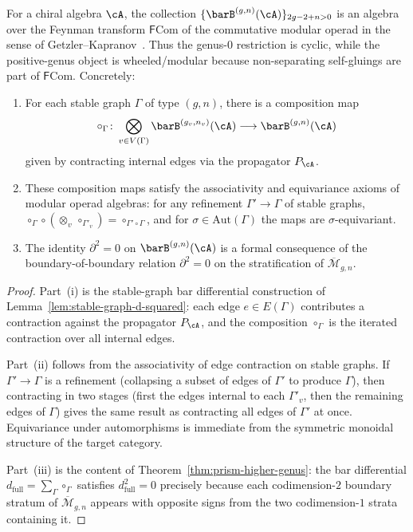 \begin{theorem}\label{thm:bar-modular-operad}%
%
%
%
For a chiral algebra $\cA$, the collection
$\{\barB^{(g,n)}(\cA)\}_{2g-2+n>0}$ is an algebra over the Feynman transform
$\mathsf{F}\mathrm{Com}$ of the commutative modular operad in the sense of
Getzler--Kapranov~\textup{\cite{GetzlerKapranov98}}. Thus the
genus-$0$ restriction is cyclic, while the positive-genus object is
wheeled/modular because non-separating self-gluings are part of
\(\mathsf{F}\mathrm{Com}\). Concretely:
\begin{enumerate}[label=\textup{(\roman*)}]
\item For each stable graph $\Gamma$ of type $(g,n)$, there is a composition
 map
 \[
 \circ_\Gamma \colon
 \bigotimes_{v \in V(\Gamma)} \barB^{(g_v,n_v)}(\cA)
 \longrightarrow \barB^{(g,n)}(\cA)
 \]
 given by contracting internal edges via the propagator $P_\cA$.
\item These composition maps satisfy the associativity and equivariance axioms
 of modular operad algebras: for any refinement $\Gamma' \to \Gamma$ of stable
 graphs, $\circ_\Gamma \circ (\otimes_v\, \circ_{\Gamma'_v})
 = \circ_{\Gamma' \circ \Gamma}$, and for $\sigma \in \mathrm{Aut}(\Gamma)$
 the maps are $\sigma$-equivariant.
\item The identity $\partial^2 = 0$ on $\barB^{(g,n)}(\cA)$ is a formal
 consequence of the boundary-of-boundary relation $\partial^2 = 0$ on the
 stratification of $\overline{\mathcal{M}}_{g,n}$.
\end{enumerate}
\end{theorem}

\begin{proof}
Part~(i) is the stable-graph bar differential construction of
Lemma~\ref{lem:stable-graph-d-squared}: each edge $e \in E(\Gamma)$ contributes
a contraction against the propagator $P_\cA$, and the composition
$\circ_\Gamma$ is the iterated contraction over all internal edges.

Part~(ii) follows from the associativity of edge contraction on stable graphs.
If $\Gamma' \to \Gamma$ is a refinement (collapsing a subset of edges of
$\Gamma'$ to produce $\Gamma$), then contracting in two stages (first the
edges internal to each $\Gamma'_v$, then the remaining edges of $\Gamma$) gives
the same result as contracting all edges of $\Gamma'$ at once. Equivariance
under automorphisms is immediate from the symmetric monoidal structure of the
target category.

Part~(iii) is the content of Theorem~\ref{thm:prism-higher-genus}: the bar
differential $d_{\mathrm{full}} = \sum_\Gamma \circ_\Gamma$ satisfies
$d_{\mathrm{full}}^2 = 0$ precisely because each codimension-$2$ boundary
stratum of $\overline{\mathcal{M}}_{g,n}$ appears with opposite signs from the
two codimension-$1$ strata containing it.
\end{proof}

